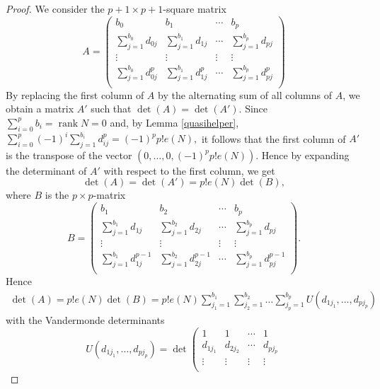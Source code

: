 \documentclass[12pt,twoside]{amsart}
\numberwithin{equation}{section}
\DeclareMathOperator{\rank}{rank}
\theoremstyle{definition}
\begin{document}
\begin{proof}
We consider the $p+1\times p+1$-square matrix
$$
A
=
\left(
  \begin{array}{ccccc}
    b_0                       & b_1                       & \cdots      & b_p \\
    \sum_{j=1}^{b_0} d_{0j}   & \sum_{j=1}^{b_1} d_{1j}   & \cdots & \sum_{j=1}^{b_p} d_{pj}   \\
    \vdots                    & \vdots                    & \vdots & \vdots \\
    \sum_{j=1}^{b_0} d_{0j}^p & \sum_{j=1}^{b_1} d_{1j}^p & \cdots & \sum_{j=1}^{b_p} d_{pj}^p   \\
  \end{array}
\right)
$$
By replacing the first column of $A$ by the alternating sum of all columns of $A$, we
obtain a matrix $A'$ such that $ \det (A) = \det(A')$. Since $\sum_{i=0}^p b_i=\rank N=0$
and, by Lemma \ref{quasihelper},  $ \sum_{i=0}^p (-1)^i \sum_{j=1}^{b_i} d_{ij}^p=(-1)^p
p! e(N), $ it follows that the first column of $A'$ is the transpose of the vector
$(0,\dots,0,(-1)^p p! e(N))$. Hence by expanding the determinant of $A'$ with respect to
the first column, we get
$$
\det(A)=\det(A')= p! e(N) \det(B),
$$
where $B$ is the $p\times p$-matrix
$$
B
=
\left(
  \begin{array}{ccccc}
    b_1                       & b_2                       & \cdots      & b_{p} \\
    \sum_{j=1}^{b_1} d_{1j}   & \sum_{j=1}^{b_2} d_{2j}   & \cdots & \sum_{j=1}^{b_{p}} d_{pj}   \\
    \vdots                    & \vdots                    & \vdots & \vdots \\
    \sum_{j=1}^{b_1} d_{1j}^{p-1} & \sum_{j=1}^{b_2} d_{2j}^{p-1} & \cdots & \sum_{j=1}^{b_{p}} d_{pj}^{p-1}   \\
  \end{array}
\right)
.
$$
Hence
\begin{eqnarray}
\label{eqeins}
\det(A)= p! e(N) \det(B)
=
p! e(N)
\sum_{j_1=1}^{b_1}
\sum_{j_2=1}^{b_2}
\dots
\sum_{j_p=1}^{b_p}
U(d_{1j_1}, \dots, d_{p j_p})
\end{eqnarray}
with the Vandermonde determinants
$$
U(d_{1j_1},\dots,d_{pj_p})
=
\det
\left(
  \begin{array}{ccccc}
    1          & 1          & \cdots   & 1 \\
    d_{1j_1}   & d_{2j_2}   & \cdots   & d_{pj_p}   \\
    \vdots                    & \vdots & \vdots & \vdots \\

\end{array}$$
\end{proof}
\end{document}
